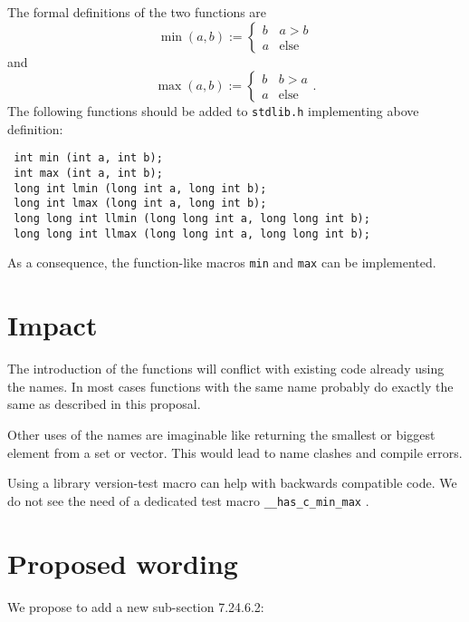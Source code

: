 \documentclass[a4paper,10pt]{scrartcl}
\begin{document}
The formal definitions of the two functions are
\begin{equation*}
 \operatorname{min}(a, b) := \begin{cases}b & a > b\\ a & \text{else}\end{cases}
\end{equation*}
and
\begin{equation*}
 \operatorname{max}(a, b) := \begin{cases}b & b > a\\ a & \text{else}\end{cases}.
\end{equation*}
The following functions should be added to \lstinline{stdlib.h} implementing above definition:
\begin{lstlisting}
 int min (int a, int b);
 int max (int a, int b);
 long int lmin (long int a, long int b);
 long int lmax (long int a, long int b);
 long long int llmin (long long int a, long long int b);
 long long int llmax (long long int a, long long int b);
\end{lstlisting}

As a consequence, the function-like macros \lstinline{min} and \lstinline{max} can be implemented.

\section{Impact}
The introduction of the functions will conflict with existing code already using the names.
In most cases functions with the same name probably do exactly the same as described in this proposal.

Other uses of the names are imaginable like returning the smallest or biggest element from a set or vector.
This would lead to name clashes and compile errors.

Using a library version-test macro can help with backwards compatible code. We do not see the need of
a dedicated test macro \lstinline{__has_c_min_max} .

\section{Proposed wording}

We propose to add a new sub-section 7.24.6.2:
\end{document}
